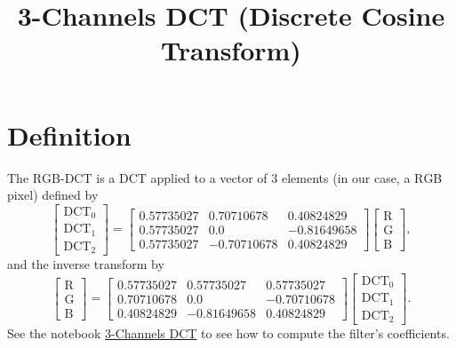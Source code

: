 
\title{3-Channels DCT (Discrete Cosine Transform)}

\maketitle

\tableofcontents

\section{Definition}

The $\text{RGB}$-DCT is a DCT applied to a vector of $3$ elements (in
our case, a $\text{RGB}$ pixel) defined by
\begin{equation}
  \begin{bmatrix}
    \text{DCT}_0 \\
    \text{DCT}_1 \\
    \text{DCT}_2
  \end{bmatrix}
  =
  \begin{bmatrix}
    0.57735027 & 0.70710678 & 0.40824829 \\
    0.57735027 & 0.0 & -0.81649658 \\
    0.57735027 & -0.70710678 & 0.40824829
  \end{bmatrix}
  \begin{bmatrix}
    \text{R} \\
    \text{G} \\
    \text{B}
  \end{bmatrix},
\end{equation}
and the inverse transform by
\begin{equation}
  \begin{bmatrix}
    \text{R} \\
    \text{G} \\
    \text{B}
  \end{bmatrix}
  =
  \begin{bmatrix}
    0.57735027 & 0.57735027 & 0.57735027 \\
    0.70710678 & 0.0 & -0.70710678 \\
    0.40824829 & -0.81649658 & 0.40824829
  \end{bmatrix}
  \begin{bmatrix}
    \text{DCT}_0 \\
    \text{DCT}_1 \\
    \text{DCT}_2
  \end{bmatrix}.
\end{equation}
See the notebook
\href{https://github.com/vicente-gonzalez-ruiz/color_transforms/blob/main/docs/3DCT/notebooks/3DCT.ipynb}{3-Channels
  DCT} to see how to compute the filter's coefficients.

